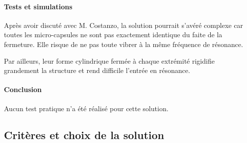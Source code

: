 \paragraph{Tests et simulations}
Après avoir discuté avec M. Costanzo, la solution pourrait s'avéré complexe car toutes les micro-capsules ne sont
pas exactement identique du faite de la fermeture. Elle risque de ne pas toute vibrer à la même fréquence de résonance.

\vspace{0.3cm}
Par ailleurs, leur forme cylindrique fermée à chaque extrémité rigidifie grandement la structure et rend difficile l'entrée
en résonance.

\paragraph{Conclusion}
Aucun test pratique n'a été réalisé pour cette solution.


\subsection{Critères et choix de la solution}
